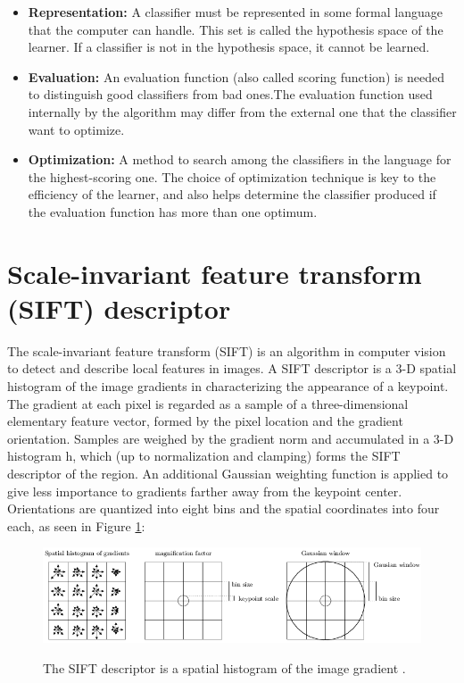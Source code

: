 \documentclass[12pt]{article}
\numberwithin{equation}{section}
\numberwithin{table}{section}
\numberwithin{figure}{section}
\begin{document}
\begin{itemize}

\item \textbf{Representation:} A classifier must be represented in some formal language that the computer can handle. This set is called the hypothesis space of the learner. If a classifier is not in the hypothesis space, it cannot be learned. 

\item \textbf{Evaluation:} An evaluation function (also called scoring function) is needed to distinguish good classifiers from bad ones.The evaluation function used internally by the algorithm may differ from the external one that the classifier want to optimize.

\item \textbf{Optimization:} A method to search among the classifiers in the language for the highest-scoring one. The choice of optimization technique is key to the efficiency of the learner, and also helps determine the classifier produced if the evaluation function has more than one optimum.
\end{itemize}



\section{Scale-invariant feature transform (SIFT) descriptor} \label{sift}
The scale-invariant feature transform (SIFT) is an algorithm in computer vision to detect and describe local features in images. A SIFT descriptor is a 3-D spatial histogram of the image gradients in characterizing the appearance of a keypoint. The gradient at each pixel is regarded as a sample of a three-dimensional elementary feature vector, formed by the pixel location and the gradient orientation. Samples are weighed by the gradient norm and accumulated in a 3-D histogram h, which (up to normalization and clamping) forms the SIFT descriptor of the region. An additional Gaussian weighting function is applied to give less importance to gradients farther away from the keypoint center. Orientations are quantized into eight bins and the spatial coordinates into four each, as seen in Figure \ref{figure6}:

\begin{figure}[H] \centering
	\caption{The SIFT descriptor is a spatial histogram of the image gradient \cite{sift}. }
	\includegraphics[width=1\textwidth]{image6.png}
	\label{figure6}
\end{figure}
\end{document}
